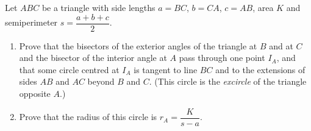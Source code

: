 Let $ABC$ be a triangle with side lengths $a=BC$, $b=CA$, $c=AB$, area $K$ and semiperimeter $s=\dfrac{a+b+c}{2}$.
\begin{enumerate}
\item[(a)] Prove that the bisectors of the exterior angles of the triangle at $B$ and at $C$ and the bisector of the interior angle at $A$ pass through one point $I_A$, and that some circle centred at $I_A$ is tangent to line $BC$ and to the extensions of sides $AB$ and $AC$ beyond $B$ and $C$. (This circle is the \emph{excircle} of the triangle opposite $A$.)
\item[(b)] Prove that the radius of this circle is $r_A=\dfrac{K}{s-a}$.
\end{enumerate}
